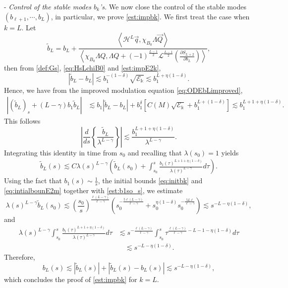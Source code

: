 \documentclass[11pt]{aims}
\theoremstyle{definition}
\numberwithin{equation}{section}
\begin{document}
\noindent - \textit{Control of the stable modes $b_k$'s.} We now close the control of the stable modes $(b_{\ell + 1}, \cdots, b_L)$, in particular, we prove \eqref{est:impbk}. We first treat the case when $k = L$. Let 
$$\tilde{b}_L = b_L + \frac{\left<{\mathscr{H}}^L \vec q,\chi_{B_0}\Lambda \vec Q \right>}{\left<\chi_{B_0}\Lambda Q, \Lambda Q  + (-1)^{\frac{L - 1}{2}}{\mathscr{L}}^{\frac{L - 1}{2}} \left(\frac{\partial S_{L+2}}{\partial b_L}\right)\right>},$$
then from \eqref{def:Gs}, \eqref{eq:HsLchiB0} and \eqref{est:impE2k}, 
$$|\tilde b_L - b_L| \lesssim b_1^{-(1 - \delta)}\sqrt{{\mathscr{E}}_{\Bbbk}} \lesssim b_1^{L + \eta(1 - \delta)}.$$
Hence, we have from the improved modulation equation \eqref{eq:ODEbLimproved}, 
\begin{align*}
|(\tilde{b}_L)_s + (L - \gamma)b_1\tilde{b}_L|&\lesssim b_1|\tilde b_L - b_L| +b_1^\delta\left[C(M)\sqrt{{\mathscr{E}}_{\Bbbk}} + b_1^{L +(1 - \delta)}\right] \lesssim b_1^{L + 1 + \eta(1 -\delta)}.
\end{align*}
This follows
$$\left|\frac{d}{ds} \left\{\frac{\tilde b_L}{\lambda^{L - \gamma}} \right\}\right| \lesssim \frac{b_1^{L + 1 + \eta(1 - \delta)}}{\lambda^{L - \gamma}}.$$
Integrating this identity in time from $s_0$ and recalling that $\lambda(s_0) = 1$ yields
\begin{align*}
\tilde{b}_L(s) \lesssim C\lambda(s)^{L - \gamma}\left(\tilde{b}_L(s_0) + \int_{s_0}^s\frac{b_1(\tau)^{L + 1 + \eta(1 - \delta)}}{\lambda(\tau)^{L - \gamma}} d\tau\right).
\end{align*}
Using the fact that $b_1(s) \sim \frac{1}{s}$, the initial bounds \eqref{eq:initbk} and \eqref{eq:intialbounE2m} together with \eqref{est:b1so_s}, we estimate
$$\lambda(s)^{L - \gamma}\tilde{b}_L(s_0) \lesssim \left(\frac{s_0}{s}\right)^{\frac{\ell(L - \gamma)}{\ell - \gamma}}\left(s_0^{-\frac{5\ell(L - \gamma)}{\ell - \gamma}} + s_0^{\eta(1 - \delta)}s_0^{-\frac{5L\ell}{\ell - \gamma}} \right) \lesssim s^{- L - \eta(1 - \delta)},$$
and 
\begin{align*}
\lambda(s)^{L - \gamma}\int_{s_0}^s\frac{b_1(\tau)^{L + 1 + \eta(1 - \delta)}}{\lambda(\tau)^{L - \gamma}} d\tau &\lesssim s^{-\frac{\ell(L - \gamma)}{\ell - \gamma}}\int_{s_0}^s \tau ^{ \frac{\ell(L - \gamma)}{\ell - \gamma} - L - 1 - \eta(1 - \delta)}d\tau\\
&\quad \lesssim s^{-L - \eta(1 - \delta)}.
\end{align*}
Therefore, 
$$b_L(s) \lesssim |\tilde{b}_L(s)| + |\tilde{b}_L(s) - b_L(s)| \lesssim s^{-L - \eta(1 - \delta)},$$
which concludes the proof of \eqref{est:impbk} for $k = L$.
\end{document}
